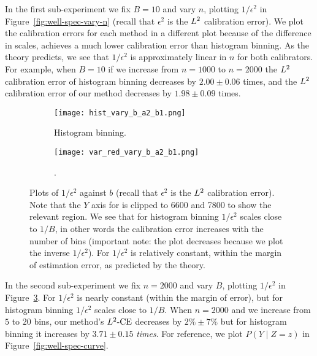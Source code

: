In the first sub-experiment we fix $B = 10$ and vary $n$, plotting $1/\epsilon^2$ in Figure~\ref{fig:well-spec-vary-n} (recall that $\epsilon^2$ is the $L^2$ calibration error). We plot the calibration errors for each method in a different plot because of the difference in scales, \ourcal{} achieves a much lower calibration error than histogram binning. As the theory predicts, we see that $1/\epsilon^2$ is approximately linear in $n$ for both calibrators. For example, when $B=10$ if we increase from $n=1000$ to $n=2000$ the $L^2$ calibration error of histogram binning decreases by $2.00 \pm 0.06$ times, and the $L^2$ calibration error of our method decreases by $1.98 \pm 0.09$ times.

\begin{figure}
  \centering
  \centering
     \begin{subfigure}[b]{0.48\textwidth}
         \centering
         \texttt{[image: hist\_vary\_b\_a2\_b1.png]}
         \caption{Histogram binning.
         }
         \label{fig:well-spec-vary-b-hist}
     \end{subfigure}
     \hfill
     \begin{subfigure}[b]{0.48\textwidth}
         \centering
         \texttt{[image: var\_red\_vary\_b\_a2\_b1.png]}
         \caption{\Ourcal{}.
         }
         \label{fig:well-spec-vary-b-var-red}
     \end{subfigure}
  \caption{
    Plots of $1/\epsilon^2$ against $b$ (recall that $\epsilon^2$ is the $L^2$ calibration error). Note that the $Y$ axis for \ourcal{} is clipped to 6600 and 7800 to show the relevant region. We see that for histogram binning $1/\epsilon^2$ scales close to $1/B$, in other words the calibration error increases with the number of bins (important note: the plot decreases because we plot the inverse $1/\epsilon^2$). For \ourcal{} $1/\epsilon^2$ is relatively constant, within the margin of estimation error, as predicted by the theory.
}
  \label{fig:well-spec-vary-b}
\end{figure}

In the second sub-experiment we fix $n = 2000$ and vary $B$, plotting $1/\epsilon^2$ in Figure~\ref{fig:well-spec-vary-b}. For \ourcal{} $1/\epsilon^2$ is nearly constant (within the margin of error), but for histogram binning $1/\epsilon^2$ scales close to $1/B$. When $n = 2000$ and we increase from $5$ to $20$ bins, our method's $L^2\textup{-CE}$ decreases by $2\% \pm 7\%$ but for histogram binning it increases by $3.71 \pm 0.15$ \emph{times}. For reference, we plot $P(Y \mid Z = z)$ in Figure~\ref{fig:well-spec-curve}.

